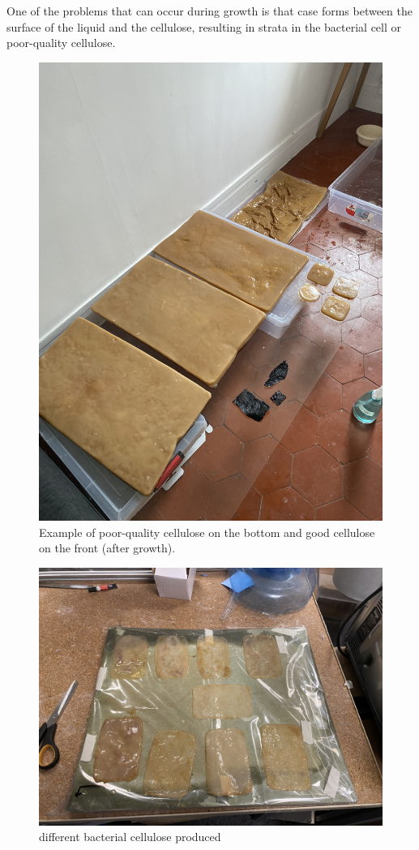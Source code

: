 One of the problems that can occur during growth is that case forms between the surface of the liquid and the cellulose, resulting in strata in the bacterial cell or poor-quality cellulose. 
\begin{figure}[h]
    \centering
    \includegraphics{images/IMG_3944.jpg}
    \caption{Example of poor-quality cellulose on the bottom and good cellulose on the front (after growth). }
    \label{fig:rotary inside}
\end{figure} 

\begin{figure}[h]
    \centering
    \includegraphics{images/IMG_4567.jpg}
    \caption{different bacterial cellulose produced}
    \label{fig:rotary inside}
\end{figure} 


